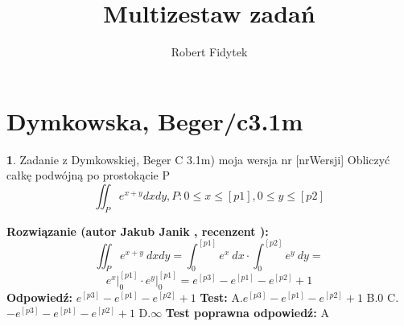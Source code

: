 \documentclass[12pt, a4paper]{article}
\title{Multizestaw zadań}
\author{Robert Fidytek}
\date{}
\theoremstyle{definition} %
\newtheorem{zad}{}
\newcommand{\kategoria}[1]{\section{#1}} %
\newcommand{\zadStart}[1]{\begin{zad}#1\newline} %
\newcommand{\zadStop}{\end{zad}}   %
\newcommand{\rozwStart}[2]{\noindent \textbf{Rozwiązanie (autor #1 , recenzent #2): }\newline} %
\newcommand{\rozwStop}{\newline}                                            %
\newcommand{\odpStart}{\noindent \textbf{Odpowiedź:}\newline}    %
\newcommand{\odpStop}{\newline}                                             %
\newcommand{\testStart}{\noindent \textbf{Test:}\newline} %
\newcommand{\testStop}{\newline} %
\newcommand{\kluczStart}{\noindent \textbf{Test poprawna odpowiedź:}\newline} %
\newcommand{\kluczStop}{\newline} %
\begin{document}
\maketitle


\kategoria{Dymkowska, Beger/c3.1m}
\zadStart{Zadanie z Dymkowskiej, Beger C 3.1m) moja wersja nr [nrWersji]}
Obliczyć całkę podwójną po prostokącie P $$\iint_P e^{x+y} dxdy, P: 0\leq x \leq [p1], 0 \leq y \leq [p2]$$
\zadStop
\rozwStart{Jakub Janik}{}
$$\iint_P e^{x+y}\ dxdy=\int_0^{[p1]}e^x\ dx \cdot \int_0^{[p2]}e^y\ dy=$$
$$e^x \Big|_0^{[p1]} \cdot e^y \Big|_0^{[p1]}=e^{[p3]}-e^{[p1]}-e^{[p2]}+1$$
\rozwStop
\odpStart
$e^{[p3]}-e^{[p1]}-e^{[p2]}+1$
\odpStop
\testStart
A.$e^{[p3]}-e^{[p1]}-e^{[p2]}+1$
B.$0$
C.$-e^{[p3]}-e^{[p1]}-e^{[p2]}+1$
D.$\infty$
\testStop
\kluczStart
A
\kluczStop
\end{document}
